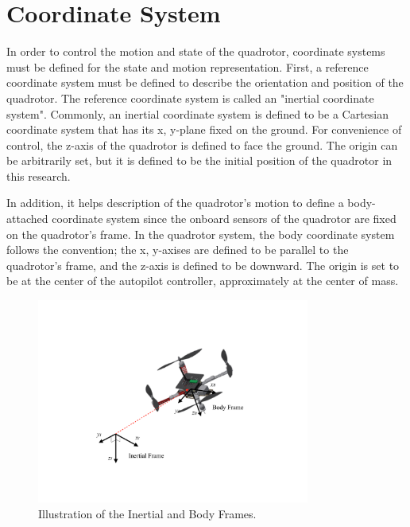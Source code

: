 \section{Coordinate System}
\label{sec:coordinate_system}

In order to control the motion and state of the quadrotor, coordinate systems must be defined for the state and motion representation.\cite{intro_to_robotics} %
First, a reference coordinate system must be defined to describe the orientation and position of the quadrotor. The reference coordinate system is called an "inertial coordinate system". Commonly, an inertial coordinate system is defined to be a Cartesian coordinate system that has its x, y-plane fixed on the ground. For convenience of control, the z-axis of the quadrotor is defined to face the ground. The origin can be arbitrarily set, but it is defined to be the initial position of the quadrotor in this research. 

In addition, it helps description of the quadrotor's motion to define a body-attached coordinate system since the onboard sensors of the quadrotor are fixed on the quadrotor's frame. In the quadrotor system, the body coordinate system follows the convention; the x, y-axises are defined to be parallel to the quadrotor's frame, and the z-axis is defined to be downward. The origin is set to be at the center of the autopilot controller, approximately at the center of mass.

\begin{figure}
    \centering
    \includegraphics[width=0.8\textwidth]{graphics/coordinate.pdf}
    \caption{Illustration of the Inertial and Body Frames.}
    \label{fig:frame}
\end{figure}

